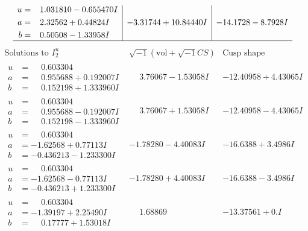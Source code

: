 \documentclass[1p]{elsarticle_modified}
\theoremstyle{definition}
\newcommand{\I}{\sqrt{-1}}
\begin{document}
$$\begin{array}{c|c|c}
\begin{aligned}
u &= \phantom{-}1.031810 - 0.655470 I \\
a &= \phantom{-}2.32562 + 0.44824 I \\
b &= \phantom{-}0.50508 - 1.33958 I\end{aligned}
 & -3.31744 + 10.84440 I & -14.1728 - 8.7928 I\\
 \hline 
 \end{array}$$\newpage$$\begin{array}{c|c|c}  
\text{Solutions to }I^u_{2}& \I (\text{vol} + \sqrt{-1}CS) & \text{Cusp shape}\\
 \hline 
\begin{aligned}
u &= \phantom{-}0.603304\phantom{ +0.000000I} \\
a &= \phantom{-}0.955688 + 0.192007 I \\
b &= \phantom{-}0.152198 + 1.333960 I\end{aligned}
 & \phantom{-}3.76067 - 1.53058 I & -12.40958 + 4.43065 I \\ \hline\begin{aligned}
u &= \phantom{-}0.603304\phantom{ +0.000000I} \\
a &= \phantom{-}0.955688 - 0.192007 I \\
b &= \phantom{-}0.152198 - 1.333960 I\end{aligned}
 & \phantom{-}3.76067 + 1.53058 I & -12.40958 - 4.43065 I \\ \hline\begin{aligned}
u &= \phantom{-}0.603304\phantom{ +0.000000I} \\
a &= -1.62568 + 0.77113 I \\
b &= -0.436213 - 1.233300 I\end{aligned}
 & -1.78280 - 4.40083 I & -16.6388 + 3.4986 I \\ \hline\begin{aligned}
u &= \phantom{-}0.603304\phantom{ +0.000000I} \\
a &= -1.62568 - 0.77113 I \\
b &= -0.436213 + 1.233300 I\end{aligned}
 & -1.78280 + 4.40083 I & -16.6388 - 3.4986 I \\ \hline\begin{aligned}
u &= \phantom{-}0.603304\phantom{ +0.000000I} \\
a &= -1.39197 + 2.25490 I \\
b &= \phantom{-}0.17777 + 1.53018 I\end{aligned}
 & \phantom{-}1.68869\phantom{ +0.000000I} & -13.37561 + 0. I\phantom{ +0.000000I} \\ \hline\begin{aligned}

\end{aligned}
\end{array}$$
\end{document}
